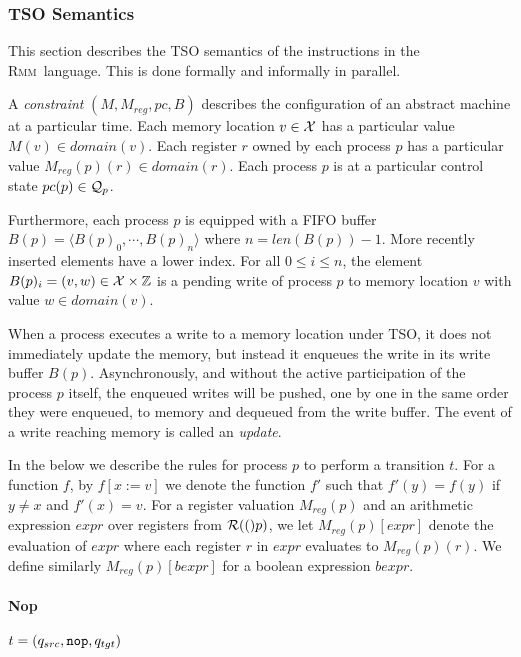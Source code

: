 \documentclass[a4paper]{article}
\newcommand{\rmm}{\textsc{Rmm}}
\begin{document}
\subsubsection{TSO Semantics}

This section describes the TSO semantics of the instructions in the
\rmm\ language. This is done formally and informally in parallel.

\newcommand{\mem}{M}
\newcommand{\regval}{M_{reg}}
\newcommand{\pc}{pc}
\newcommand{\buf}{B}

A \emph{constraint} $(\mem,\regval,\pc,\buf)$ describes the
configuration of an abstract machine at a particular time. Each memory
location $v\in\mathcal{X}$ has a particular value $\mem(v)\in
domain(v)$. Each register $r$ owned by each process $p$ has a
particular value $\regval(p)(r)\in domain(r)$. Each process $p$ is at
a particular control state $\pc(p)\in\pcstates{p}$.

Furthermore, each process $p$ is equipped with a FIFO buffer
\\$\buf(p) = \langle \buf(p)_0, \cdots, \buf(p)_n\rangle$ where $n =
len(\buf(p)) - 1$. More recently inserted elements have a lower
index. For all $0 \leq i \leq n$, the element $\buf(p)_i = (v,w) \in
\vars\times\mathbb{Z}$ is a pending write of process $p$ to memory
location $v$ with value $w\in domain(v)$.

When a process executes a write to a memory location under TSO, it
does not immediately update the memory, but instead it enqueues the
write in its write buffer $\buf(p)$. Asynchronously, and without the
active participation of the process $p$ itself, the enqueued writes
will be pushed, one by one in the same order they were enqueued, to
memory and dequeued from the write buffer. The event of a write
reaching memory is called an \emph{update}.

In the below we describe the rules for process $p$ to perform a
transition $t$. For a function $f$, by $f[x:=v]$ we denote the
function $f'$ such that $f'(y) = f(y)$ if $y \neq x$ and $f'(x) =
v$. For a register valuation $\regval(p)$ and an arithmetic expression
$expr$ over registers from $\mathcal{R}(()p)$, we let $\regval(p)[expr]$
denote the evaluation of $expr$ where each register $r$ in $expr$
evaluates to $\regval(p)(r)$. We define similarly $\regval(p)[bexpr]$
for a boolean expression $bexpr$.

\newcommand{\sep}{\rule{10pt}{0pt}}

\paragraph{Nop} $t = (q_{src},\verb+nop+,q_{tgt})$
\end{document}
